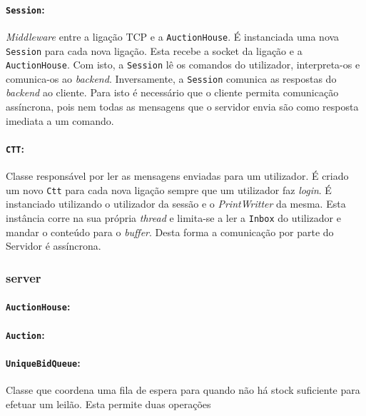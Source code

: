 \documentclass[a4paper]{article}
\begin{document}
\paragraph{\texttt{Session}:}

\textit{Middleware} entre a ligação TCP e a \texttt{AuctionHouse}. É instanciada uma nova \texttt{Session} para cada nova ligação. Esta recebe a socket da ligação e a \texttt{AuctionHouse}. Com isto, a \texttt{Session} lê os comandos do utilizador, interpreta-os e comunica-os ao \textit{backend}. Inversamente, a \texttt{Session} comunica as respostas do \textit{backend} ao cliente. Para isto é necessário que o cliente permita comunicação assíncrona, pois nem todas as mensagens que o servidor envia são como resposta imediata a um comando.

\paragraph{\texttt{CTT}:}

Classe responsável por ler as mensagens enviadas para um utilizador. É criado um novo \texttt{Ctt} para cada nova ligação sempre que um utilizador faz \textit{login}. É instanciado utilizando o utilizador da sessão e o \textit{PrintWritter} da mesma. Esta instância corre na sua própria \textit{thread} e limita-se a ler a \texttt{Inbox} do utilizador e mandar o conteúdo para o \textit{buffer}. Desta forma a comunicação por parte do Servidor é assíncrona. 


\subsubsection{server}
\paragraph{\texttt{AuctionHouse}:}


\paragraph{\texttt{Auction}:}


\paragraph{\texttt{UniqueBidQueue}:}
Classe que coordena uma fila de espera para quando não há stock suficiente para efetuar um leilão. Esta permite duas operações
\end{document}
